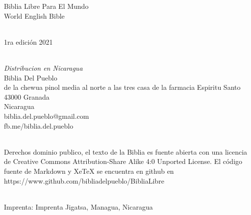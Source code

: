 \hfill\break
Biblia Libre Para El Mundo\\
World English Bible\\
\strut \\
1ra edición 2021\\
\strut \\
\emph{Distribucion en Nicaragua}\\
Biblia Del Pueblo\\
de la chewua pinol media al norte a las tres casa de la farmacia
Espiritu Santo\\
43000 Granada\\
Nicaragua\\
biblia.del.pueblo@gmail.com\\
fb.me/biblia.del.pueblo\\
\strut \\
Derechos dominio publico, el texto de la Biblia es fuente abierta con
una licencia de Creative Commons Attribution-Share Alike 4:0 Unported
License. El código fuente de Markdown y XeTeX se encuentra en github
en\\
https://www.github.com/bibliadelpueblo/BibliaLibre\\
\strut \\
Imprenta: Imprenta Jigatsa, Managua, Nicaragua\\
